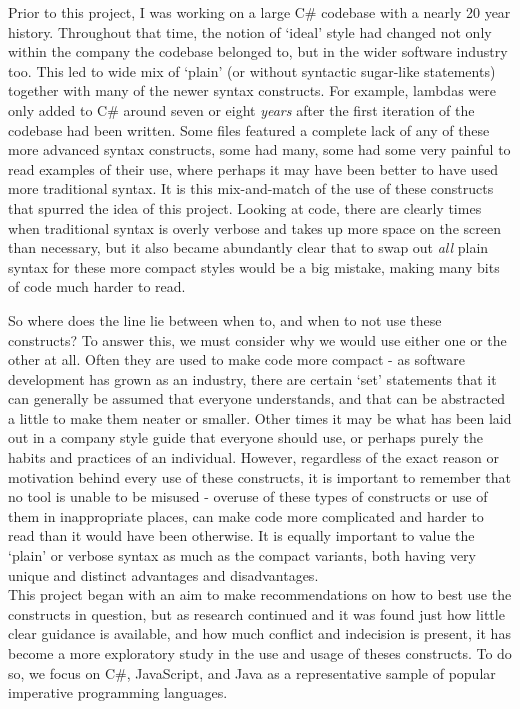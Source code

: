 \documentclass{article}
\begin{document}
        Prior to this project, I was working on a large C\# codebase with a nearly 20 year history. Throughout that time, the notion of `ideal' style had changed not only within the company the codebase belonged to, but in the wider software industry too. This led to wide mix of `plain' (or without syntactic sugar-like statements) together with many of the newer syntax constructs. For example, lambdas were only added to C\# around seven or eight \emph{years} after the first iteration of the codebase had been written. Some files featured a complete lack of any of these more advanced syntax constructs, some had many, some had some very painful to read examples of their use, where perhaps it may have been better to have used more traditional syntax. It is this mix-and-match of the use of these constructs that spurred the idea of this project. Looking at code, there are clearly times when traditional syntax is overly verbose and takes up more space on the screen than necessary, but it also became abundantly clear that to swap out \emph{all} plain syntax for these more compact styles would be a big mistake, making many bits of code much harder to read.

        So where does the line lie between when to, and when to not use these constructs? To answer this, we must consider why we would use either one or the other at all. Often they are used to make code more compact - as software development has grown as an industry, there are certain `set' statements that it can generally be assumed that everyone understands, and that can be abstracted a little to make them neater or smaller. Other times it may be what has been laid out in a company style guide that everyone should use, or perhaps purely the habits and practices of an individual. However, regardless of the exact reason or motivation behind every use of these constructs, it is important to remember that no tool is unable to be misused - overuse of these types of constructs or use of them in inappropriate places, can make code more complicated and harder to read than it would have been otherwise. It is equally important to value the `plain' or verbose syntax as much as the compact variants, both having very unique and distinct advantages and disadvantages.
        \\

        This project began with an aim to make recommendations on how to best use the constructs in question, but as research continued and it was found just how little clear guidance is available, and how much conflict and indecision is present, it has become a more exploratory study in the use and usage of theses constructs. To do so, we focus on C\#, JavaScript, and Java as a representative sample of popular imperative programming languages.
\end{document}
